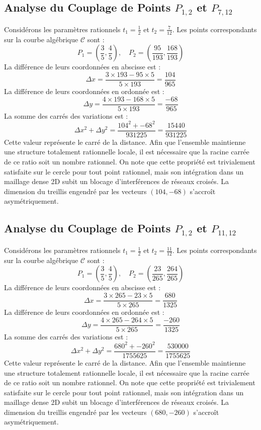 \documentclass[12pt, a4paper]{article}
\begin{document}
\subsection{Analyse du Couplage de Points $P_{1,2}$ et $P_{7,12}$}
Considérons les paramètres rationnels $t_1 = \frac{1}{2}$ et $t_2 = \frac{7}{12}$.
Les points correspondants sur la courbe algébrique $\mathcal{C}$ sont :
$$ P_1 = \left( \frac{3}{5}, \frac{4}{5} \right), \quad P_2 = \left( \frac{95}{193}, \frac{168}{193} \right) $$
La différence de leurs coordonnées en abscisse est :
$$ \Delta x = \frac{3 \times 193 - 95 \times 5}{5 \times 193} = \frac{104}{965} $$
La différence de leurs coordonnées en ordonnée est :
$$ \Delta y = \frac{4 \times 193 - 168 \times 5}{5 \times 193} = \frac{-68}{965} $$
La somme des carrés des variations est :
$$ \Delta x^2 + \Delta y^2 = \frac{ 104^2 + -68^2 }{ 931225 } = \frac{ 15440 }{ 931225 } $$
Cette valeur représente le carré de la distance. Afin que l'ensemble maintienne une structure totalement rationnelle locale, il est nécessaire que la racine carrée de ce ratio soit un nombre rationnel. On note que cette propriété est trivialement satisfaite sur le cercle pour tout point rationnel, mais son intégration dans un maillage dense 2D subit un blocage d'interférences de réseaux croisés. La dimension du treillis engendré par les vecteurs $( 104, -68 )$ s'accroît asymétriquement.


\subsection{Analyse du Couplage de Points $P_{1,2}$ et $P_{11,12}$}
Considérons les paramètres rationnels $t_1 = \frac{1}{2}$ et $t_2 = \frac{11}{12}$.
Les points correspondants sur la courbe algébrique $\mathcal{C}$ sont :
$$ P_1 = \left( \frac{3}{5}, \frac{4}{5} \right), \quad P_2 = \left( \frac{23}{265}, \frac{264}{265} \right) $$
La différence de leurs coordonnées en abscisse est :
$$ \Delta x = \frac{3 \times 265 - 23 \times 5}{5 \times 265} = \frac{680}{1325} $$
La différence de leurs coordonnées en ordonnée est :
$$ \Delta y = \frac{4 \times 265 - 264 \times 5}{5 \times 265} = \frac{-260}{1325} $$
La somme des carrés des variations est :
$$ \Delta x^2 + \Delta y^2 = \frac{ 680^2 + -260^2 }{ 1755625 } = \frac{ 530000 }{ 1755625 } $$
Cette valeur représente le carré de la distance. Afin que l'ensemble maintienne une structure totalement rationnelle locale, il est nécessaire que la racine carrée de ce ratio soit un nombre rationnel. On note que cette propriété est trivialement satisfaite sur le cercle pour tout point rationnel, mais son intégration dans un maillage dense 2D subit un blocage d'interférences de réseaux croisés. La dimension du treillis engendré par les vecteurs $( 680, -260 )$ s'accroît asymétriquement.
\end{document}
